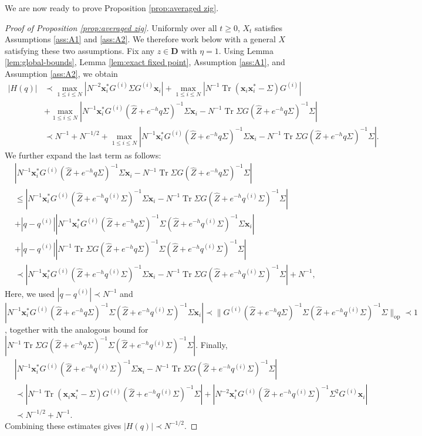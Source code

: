 \documentclass[11pt,reqno]{amsart}
\def\x{\mathbf{x}}
\def\bD{\mathbf{D}}
\def\op{\mathrm{op}}
\def\Tr{\operatorname{Tr}}
\theoremstyle{definition}
\numberwithin{equation}{section}
\numberwithin{figure}{section}
\begin{document}
We are now ready to prove Proposition \ref{prop:averaged zig}.
\begin{proof}[Proof of Proposition \ref{prop:averaged zig}]
Uniformly over all $t\geq 0$, $X_t$ satisfies Assumptions \ref{ass:A1} and \ref{ass:A2}. We therefore work below with a general $X$ satisfying these two assumptions. Fix any $z\in\bD$ with $\eta=1$. Using Lemma \ref{lem:global-bounds}, Lemma \ref{lem:exact fixed point}, Assumption \ref{ass:A1}, and Assumption \ref{ass:A2}, we obtain
\begin{align*}
    |H(q)|&\prec \max_{1\leq i\leq N}|N^{-2}\x_i^* G^{(i)}\Sigma G^{(i)}\x_i|+\max_{1\leq i\leq N}|N^{-1}\Tr(\x_i\x_i^*-\Sigma)G^{(i)}|\\
    &+\max_{1\leq i\leq N}|N^{-1}\x_i^*G^{(i)}(\hat Z+e^{-h}q\Sigma)^{-1}\Sigma\x_i-N^{-1}\Tr\Sigma G(\hat Z+e^{-h}q\Sigma)^{-1}\Sigma|\\
    &\prec N^{-1}+N^{-1/2}+\max_{1\leq i\leq N}|N^{-1}\x_i^*G^{(i)}(\hat Z+e^{-h}q\Sigma)^{-1}\Sigma\x_i-N^{-1}\Tr\Sigma G(\hat Z+e^{-h}q\Sigma)^{-1}\Sigma|.
\end{align*}
We further expand the last term as follows:
\begin{align*}
    &|N^{-1}\x_i^*G^{(i)}(\hat Z+e^{-h}q\Sigma)^{-1}\Sigma\x_i-N^{-1}\Tr\Sigma G(\hat Z+e^{-h}q\Sigma)^{-1}\Sigma|\\
    &\leq |N^{-1}\x_i^*G^{(i)}(\hat Z+e^{-h}q^{(i)}\Sigma)^{-1}\Sigma\x_i-N^{-1}\Tr\Sigma G(\hat Z+e^{-h}q^{(i)}\Sigma)^{-1}\Sigma|\\
    &+|q-q^{(i)}||N^{-1}\x_i^*G^{(i)}(\hat Z+e^{-h}q\Sigma)^{-1}\Sigma(\hat Z+e^{-h}q^{(i)}\Sigma)^{-1}\Sigma\x_i|\\
    &+|q-q^{(i)}||N^{-1}\Tr\Sigma G(\hat Z+e^{-h}q\Sigma)^{-1}\Sigma(\hat Z+e^{-h}q^{(i)}\Sigma)^{-1}\Sigma|\\
    &\prec |N^{-1}\x_i^*G^{(i)}(\hat Z+e^{-h}q^{(i)}\Sigma)^{-1}\Sigma\x_i-N^{-1}\Tr\Sigma G(\hat Z+e^{-h}q^{(i)}\Sigma)^{-1}\Sigma|+N^{-1},
\end{align*}
Here, we used $|q-q^{(i)}|\prec N^{-1}$ and $|N^{-1}\x_i^*G^{(i)}(\hat Z+e^{-h}q\Sigma)^{-1}\Sigma(\hat Z+e^{-h}q^{(i)}\Sigma)^{-1}\Sigma\x_i|\prec \|G^{(i)}(\hat Z+e^{-h}q\Sigma)^{-1}\Sigma(\hat Z+e^{-h}q^{(i)}\Sigma)^{-1}\Sigma\|_\op\prec 1$, together with the analogous bound for $|N^{-1}\Tr\Sigma G(\hat Z+e^{-h}q\Sigma)^{-1}\Sigma(\hat Z+e^{-h}q^{(i)}\Sigma)^{-1}\Sigma|$. Finally,
\begin{align*}
    &|N^{-1}\x_i^*G^{(i)}(\hat Z+e^{-h}q^{(i)}\Sigma)^{-1}\Sigma\x_i-N^{-1}\Tr\Sigma G(\hat Z+e^{-h}q^{(i)}\Sigma)^{-1}\Sigma|\\
    &\prec |N^{-1}\Tr(\x_i\x_i^*-\Sigma)G^{(i)}(\hat Z+e^{-h}q^{(i)}\Sigma)^{-1}\Sigma|+|N^{-2}\x_i^*G^{(i)}(\hat Z+e^{-h}q^{(i)}\Sigma)^{-1}\Sigma^2G^{(i)}\x_i|\\
    &\prec N^{-1/2}+N^{-1}.
\end{align*}
Combining these estimates gives $|H(q)|\prec N^{-1/2}$.


\end{proof}
\end{document}

